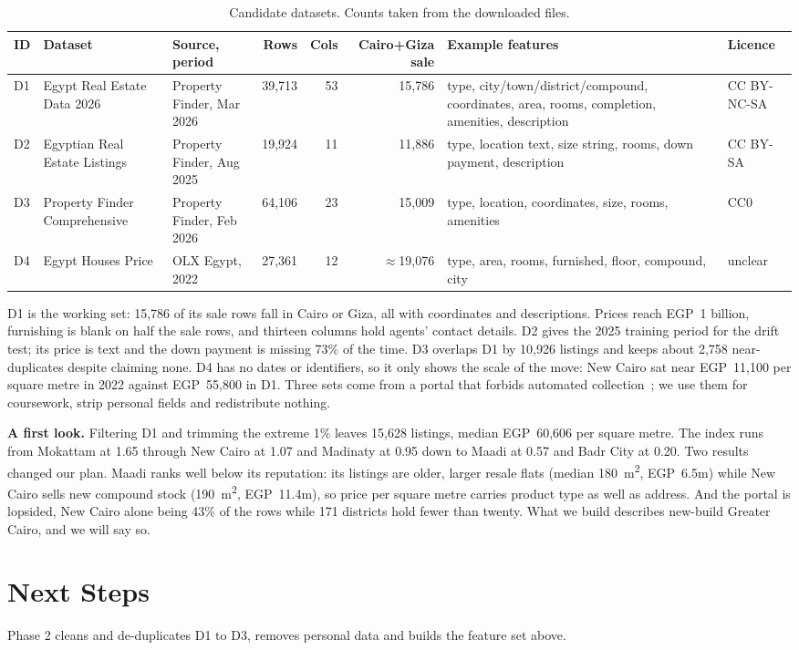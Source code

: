 \documentclass[sigconf,nonacm,10pt]{acmart}
\begin{document}
\begin{table}[t]
\caption{Candidate datasets. Counts taken from the downloaded files.}
\label{tab:data}
\small
\begin{tabularx}{\textwidth}{@{}p{0.4cm}p{2.7cm}p{2.1cm}rrrXp{1.7cm}@{}}
\toprule
ID & Dataset & Source, period & Rows & Cols & Cairo+Giza sale & Example features & Licence \\
\midrule
D1 & Egypt Real Estate Data 2026~\cite{ds_2026pf} & Property Finder, Mar 2026 & 39,713 & 53 & 15,786 & type, city/town/district/compound, coordinates, area, rooms, completion, amenities, description & CC BY-NC-SA \\
D2 & Egyptian Real Estate Listings~\cite{ds_2025pf} & Property Finder, Aug 2025 & 19,924 & 11 & 11,886 & type, location text, size string, rooms, down payment, description & CC BY-SA \\
D3 & Property Finder Comprehensive~\cite{ds_2026pfc} & Property Finder, Feb 2026 & 64,106 & 23 & 15,009 & type, location, coordinates, size, rooms, amenities & CC0 \\
D4 & Egypt Houses Price~\cite{ds_2022olx} & OLX Egypt, 2022 & 27,361 & 12 & $\approx$19,076 & type, area, rooms, furnished, floor, compound, city & unclear \\
\bottomrule
\end{tabularx}
\end{table}

D1 is the working set: 15,786 of its sale rows fall in Cairo or Giza, all with coordinates and descriptions. Prices reach EGP~1 billion, furnishing is blank on half the sale rows, and thirteen columns hold agents' contact details. D2 gives the 2025 training period for the drift test; its price is text and the down payment is missing 73\% of the time. D3 overlaps D1 by 10,926 listings and keeps about 2,758 near-duplicates despite claiming none. D4 has no dates or identifiers, so it only shows the scale of the move: New Cairo sat near EGP~11,100 per square metre in 2022 against EGP~55,800 in D1. Three sets come from a portal that forbids automated collection~\cite{pf_terms}; we use them for coursework, strip personal fields and redistribute nothing.

\textbf{A first look.} Filtering D1 and trimming the extreme 1\% leaves 15,628 listings, median EGP~60,606 per square metre. The index runs from Mokattam at 1.65 through New Cairo at 1.07 and Madinaty at 0.95 down to Maadi at 0.57 and Badr City at 0.20. Two results changed our plan. Maadi ranks well below its reputation: its listings are older, larger resale flats (median 180~m\textsuperscript{2}, EGP~6.5m) while New Cairo sells new compound stock (190~m\textsuperscript{2}, EGP~11.4m), so price per square metre carries product type as well as address. And the portal is lopsided, New Cairo alone being 43\% of the rows while 171 districts hold fewer than twenty. What we build describes new-build Greater Cairo, and we will say so.

\section{Next Steps}
Phase 2 cleans and de-duplicates D1 to D3, removes personal data and builds the feature set above.


\end{document}
